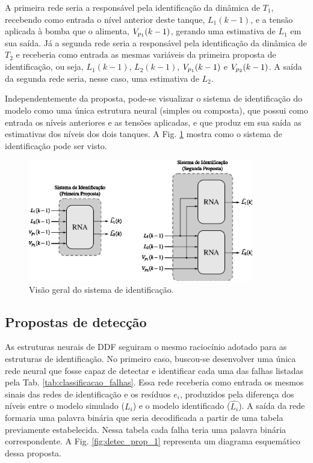 A primeira rede seria a responsável pela identificação da dinâmica de $T_1$,
recebendo como entrada o nível anterior deste tanque, $L_1(k-1)$, e a tensão
aplicada à bomba que o alimenta, $V_{p_{\tiny 1}}(k-1)$, gerando uma estimativa
de $L_1$ em sua saída. Já a segunda rede seria a responsável pela identificação
da dinâmica de $T_2$ e receberia como entrada as mesmas variáveis da primeira
proposta de identificação, ou seja, $L_1(k-1)$, $L_2(k-1)$, $V_{p_{\tiny
1}}(k-1)$ e $V_{p_{\tiny 2}}(k-1)$. A saída da segunda rede seria, nesse caso,
uma estimativa de $L_2$.

Independentemente da proposta, pode-se visualizar o sistema de identificação do
modelo como uma única estrutura neural (simples ou composta), que possui como
entrada os níveis anteriores e as tensões aplicadas, e que produz em sua saída
as estimativas dos níveis dos dois tanques. A Fig. \ref{fig:sist_ident} mostra
como o sistema de identificação pode ser visto.

\begin{figure}[!htb]
\centering
    \includegraphics[width=0.875\textwidth]{imgs/sistema/eps/sist_ident}
    \caption{Visão geral do sistema de identificação.}
    \label{fig:sist_ident}
\end{figure}

\subsection{Propostas de detecção}
As estruturas neurais de DDF seguiram o mesmo raciocínio adotado para as
estruturas de identificação. No primeiro caso, buscou-se desenvolver uma única
rede neural que fosse capaz de detectar e identificar cada uma das falhas
listadas pela Tab. \ref{tab:classificacao_falhas}. Essa rede receberia como
entrada os mesmos sinais das redes de identificação e os resíduos $e_i$,
produzidos pela diferença dos níveis entre o modelo simulado ($L_i$) e o modelo
identificado ($\widehat{L_i}$). A saída da rede formaria uma palavra binária que
seria decodificada a partir de uma tabela previamente estabelecida. Nessa tabela
cada falha teria uma palavra binária correspondente. A Fig.
\ref{fig:detec_prop_1} representa um diagrama esquemático dessa proposta.

